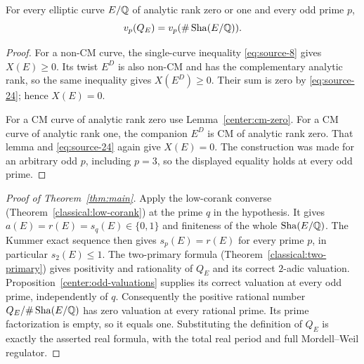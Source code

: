\begin{proposition}\label{center:odd-valuations}
For every elliptic curve $E/\mathbb Q$ of analytic rank zero or one and
every odd prime $p$,
\[
                  v_p(Q_E)=v_p(\#\operatorname{Sha}(E/\mathbb Q)).
\]
\end{proposition}

\begin{proof}
For a non-CM curve, the single-curve inequality
\eqref{eq:source-8} gives $X(E)\geq0$.  Its twist $E^D$ is
also non-CM and has the complementary analytic rank, so the
same inequality gives $X(E^D)\geq0$.  Their sum is zero by
\eqref{eq:source-24}; hence $X(E)=0$.

For a CM curve of analytic rank zero use
Lemma~\ref{center:cm-zero}.  For a CM curve of analytic rank one,
the companion $E^D$ is CM of analytic rank zero.  That lemma and
\eqref{eq:source-24} again give $X(E)=0$.  The construction was
made for an arbitrary odd $p$, including $p=3$, so the displayed
equality holds at every odd prime.
\end{proof}

\begin{proof}[Proof of Theorem~\ref{thm:main}]
Apply the low-corank converse
(Theorem~\ref{classical:low-corank}) at the prime $q$ in the
hypothesis.  It gives
$a(E)=r(E)=s_q(E)\in\{0,1\}$ and finiteness of the whole
$\operatorname{Sha}(E/\mathbb Q)$.  The Kummer exact sequence then gives
$s_p(E)=r(E)$ for every prime $p$, in particular $s_2(E)\leq1$.
The two-primary formula
(Theorem~\ref{classical:two-primary}) gives positivity and
rationality of $Q_E$ and its correct $2$-adic valuation.
Proposition~\ref{center:odd-valuations} supplies its correct
valuation at every odd prime, independently of $q$.
Consequently the positive rational number
$Q_E/\#\operatorname{Sha}(E/\mathbb Q)$ has zero valuation at every rational prime.
Its prime factorization is empty, so it equals one.  Substituting
the definition of $Q_E$ is exactly the asserted real formula,
with the total real period and full Mordell--Weil regulator.
\end{proof}
